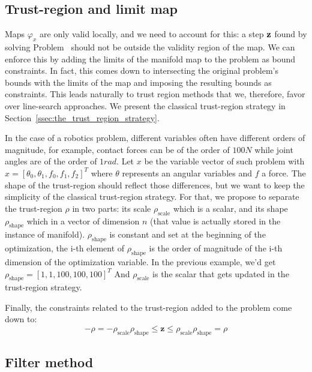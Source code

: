 \subsection{Trust-region and limit map}
\label{sub:trust_region_and_limit_map}

Maps $\varphi_{x}$ are only valid locally, and we need to account for this: a step ${\bf z}$ found by solving Problem~ should not be outside the validity region of the map.
We can enforce this by adding the limits of the manifold map to the problem as bound constraints.
In fact, this comes down to intersecting the original problem's bounds with the limits of the map and imposing the resulting bounds as constraints.
This leads naturally to trust region methods that we, therefore, favor over line-search approaches.
We present the classical trust-region strategy in Section~\ref{ssec:the_trust_region_strategy}.

In the case of a robotics problem, different variables often have different orders of magnitude, for example, contact forces can be of the order of $100N$ while joint angles are of the order of $1rad$.
Let $x$ be the variable vector of such problem with $x={[\theta_0, \theta_1, f_0, f_1, f_2]}^T$ where $\theta$ represents an angular variables and $f$ a force.
The shape of the trust-region should reflect those differences, but we want to keep the simplicity of the classical trust-region strategy.
For that, we propose to separate the trust-region $\rho$ in two parts: its scale $\rho_\text{scale}$ which is a scalar, and its shape $\rho_\text{shape}$ which in a vector of dimension $n$ (that value is actually stored in the instance of manifold).
$\rho_\text{shape}$ is constant and set at the beginning of the optimization, the i-th element of $\rho_\text{shape}$ is the order of magnitude of the i-th dimension of the optimization variable.
In the previous example, we'd get ${\rho_\text{shape}} = {[1,1,100,100,100]}^T$
And $\rho_\text{scale}$ is the scalar that gets updated in the trust-region strategy.

Finally, the constraints related to the trust-region added to the problem come down to:
\begin{equation}
  -\rho = -\rho_\text{scale}\rho_\text{shape} \leq \mathbf{z} \leq \rho_\text{scale}\rho_\text{shape} = \rho
\end{equation}

\subsection{Filter method}
\label{sub:filter_method}

